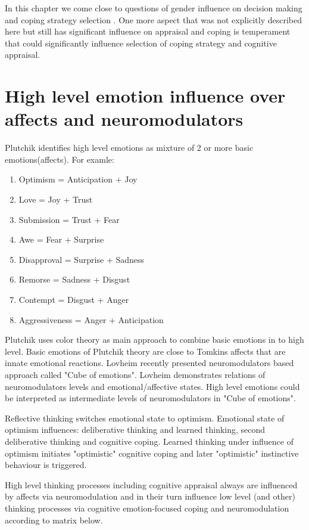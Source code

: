 In this chapter we come close to questions of gender influence on decision making and coping strategy selection \cite{sex_differencies}. One more aspect that was not explicitly described here but still has significant influence on appraisal and coping is temperament that could significantly influence selection of coping strategy and cognitive appraisal.

\section{High level emotion influence over affects and neuromodulators}

Plutchik identifies high level emotions \cite{natureofemotions} as mixture of 2 or more basic emotions(affects). For examle:

\begin{enumerate}
\item  Optimism =	Anticipation + Joy
\item  Love =	Joy + Trust
\item  Submission = Trust + Fear
\item  Awe = Fear + Surprise
\item  Disapproval = Surprise + Sadness
\item  Remorse = Sadness + Disgust
\item  Contempt = Disgust + Anger
\item  Aggressiveness =	Anger + Anticipation
\end{enumerate}

Plutchik uses color theory as main approach to combine basic emotions in to high level. Basic emotions of Plutchik theory are close to Tomkins affects that are innate emotional reactions. Lovheim recently presented neuromodulators based approach called "Cube of emotions"\cite{cubeofemotions}. Lovheim demonstrates relations of neuromodulators levels and emotional/affective states. High level emotions could be interpreted as intermediate levels of neuromodulators in "Cube of emotions"\cite{cubeofemotions}.



Reflective thinking switches emotional state to optimism. Emotional state of optimism influences: deliberative thinking and learned thinking, second deliberative thinking and cognitive coping. Learned thinking under influence of optimism initiates "optimistic" cognitive coping and later "optimistic" instinctive behaviour is triggered.

High level thinking processes including cognitive appraisal always are influenced by affects via neuromodulation and in their turn influence low level (and other) thinking processes via cognitive emotion-focused coping and neuromodulation according to matrix below.

